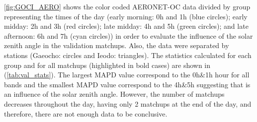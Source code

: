 \documentclass[onecolumn,3p,letterpaper,11pt]{elsarticle}
\begin{document}
\autoref{fig:GOCI_AERO} shows the color coded AERONET-OC data divided by group representing the times of the day (early morning: 0h and 1h (blue circles); early midday: 2h and 3h (red circles); late midday: 4h and 5h (green circles); and late afternoon: 6h and 7h (cyan circles)) in order to evaluate the influence of the solar zenith angle in the validation matchups. Also, the data were separated by stations (Gaeocho: circles and Ieodo: triangles). The statistics calculated for each group and for all matchups (highlighted in bold cases) are shown in (\autoref{tab:val_stats}). The largest MAPD value correspond to the 0h\&1h hour for all bands and the smallest MAPD value correspond to the 4h\&5h suggesting that is an influence of the solar zenith angle. However, the number of matchups decreases throughout the day, having only 2 matchups at the end of the day, and therefore, there are not enough data to be conclusive.
\end{document}
